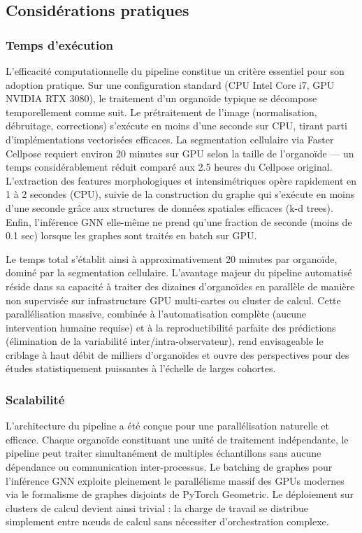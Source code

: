 \subsection{Considérations pratiques}

\subsubsection{Temps d'exécution}

L'efficacité computationnelle du pipeline constitue un critère essentiel pour son adoption pratique. Sur une configuration standard (CPU Intel Core i7, GPU NVIDIA RTX 3080), le traitement d'un organoïde typique se décompose temporellement comme suit. Le prétraitement de l'image (normalisation, débruitage, corrections) s'exécute en moins d'une seconde sur CPU, tirant parti d'implémentations vectorisées efficaces. La segmentation cellulaire via Faster Cellpose requiert environ 20 minutes sur GPU selon la taille de l'organoïde — un temps considérablement réduit comparé aux 2.5 heures du Cellpose original. L'extraction des features morphologiques et intensimétriques opère rapidement en 1 à 2 secondes (CPU), suivie de la construction du graphe qui s'exécute en moins d'une seconde grâce aux structures de données spatiales efficaces (k-d trees). Enfin, l'inférence GNN elle-même ne prend qu'une fraction de seconde (moins de 0.1 sec) lorsque les graphes sont traités en batch sur GPU.

Le temps total s'établit ainsi à approximativement 20 minutes par organoïde, dominé par la segmentation cellulaire. L'avantage majeur du pipeline automatisé réside dans sa capacité à traiter des dizaines d'organoïdes en parallèle de manière non supervisée sur infrastructure GPU multi-cartes ou cluster de calcul. Cette parallélisation massive, combinée à l'automatisation complète (aucune intervention humaine requise) et à la reproductibilité parfaite des prédictions (élimination de la variabilité inter/intra-observateur), rend envisageable le criblage à haut débit de milliers d'organoïdes et ouvre des perspectives pour des études statistiquement puissantes à l'échelle de larges cohortes.

\subsubsection{Scalabilité}

L'architecture du pipeline a été conçue pour une parallélisation naturelle et efficace. Chaque organoïde constituant une unité de traitement indépendante, le pipeline peut traiter simultanément de multiples échantillons sans aucune dépendance ou communication inter-processus. Le batching de graphes pour l'inférence GNN exploite pleinement le parallélisme massif des GPUs modernes via le formalisme de graphes disjoints de PyTorch Geometric. Le déploiement sur clusters de calcul devient ainsi trivial : la charge de travail se distribue simplement entre nœuds de calcul sans nécessiter d'orchestration complexe.

